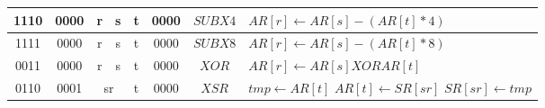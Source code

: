 \begin{longtable}{llllllllllllllllllllllll  p{1cm}  p{6cm} | }
		\multicolumn{4}{|c|}{1110} & \multicolumn{4}{c|}{0000} & \multicolumn{4}{c|}{r} & \multicolumn{4}{c|}{s} & \multicolumn{4}{c|}{t} & \multicolumn{4}{c|}{0000} & \multicolumn{1}{c|}{$SUBX4$} & $AR[r] \leftarrow AR[s] - (AR[t]*4)$ \\ \hline        
		\multicolumn{4}{|c|}{1111} & \multicolumn{4}{c|}{0000} & \multicolumn{4}{c|}{r} & \multicolumn{4}{c|}{s} & \multicolumn{4}{c|}{t} & \multicolumn{4}{c|}{0000} & \multicolumn{1}{c|}{$SUBX8$} & $AR[r] \leftarrow AR[s] - (AR[t]*8)$ \\ \hline
		\multicolumn{4}{|c|}{0011} & \multicolumn{4}{c|}{0000} & \multicolumn{4}{c|}{r} & \multicolumn{4}{c|}{s} & \multicolumn{4}{c|}{t} & \multicolumn{4}{c|}{0000} & \multicolumn{1}{c|}{$XOR$} & $AR[r] \leftarrow AR[s] XOR AR[t]$ \\ \hline
		\multicolumn{4}{|c|}{0110} & \multicolumn{4}{c|}{0001} & \multicolumn{8}{c|}{sr} & \multicolumn{4}{c|}{t} & \multicolumn{4}{c|}{0000} & \multicolumn{1}{c|}{$XSR$} & $tmp \leftarrow AR[t]$ \newline $AR[t] \leftarrow SR[sr]$ \newline $SR[sr] \leftarrow tmp$ \\ \hline
	\end{longtable}

